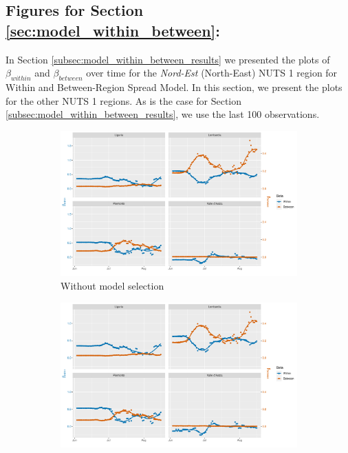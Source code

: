 \documentclass[12pt]{article}
\begin{document}
\begin{appendices}
		\subsection{Figures for Section \ref{sec:model_within_between}: } \label{sapp:model_within_between_figures}
		In Section \ref{subsec:model_within_between_results} we presented the plots of $\beta_{within}$ and $\beta_{between}$ over time for the \textit{Nord-Est} (North-East) NUTS 1 region for Within and Between-Region Spread Model. In this section, we present the plots for the other NUTS 1 regions. As is the case for Section \ref{subsec:model_within_between_results}, we use the last 100 observations.
		
		\begin{figure}[H]
    	    \centering
    	    \begin{subfigure}{\textwidth}
    	      \centering
    	      \includegraphics[width=0.95\linewidth]{output/model3_lag3_betas_Nord-Ovest_rolling.pdf}
    	      \caption{Without model selection}
    	      \label{fig:beta_within_between_over_time_nordovest_regular}
    	    \end{subfigure}\newline
    	    \begin{subfigure}{\textwidth}
    	      \centering
    	      \includegraphics[width=0.95\linewidth]{output/model3_lag3_betas_Nord-Ovest_aic_rolling.pdf}

\end{subfigure}
\end{figure}
\end{appendices}
\end{document}
